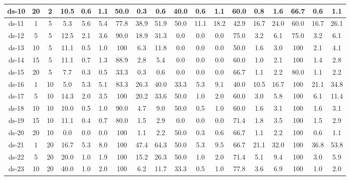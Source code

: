 \begin{table*}[h]
\begin{tabular}{|c|c|c|c|c|c|c|c|c|c|c|c|c|c|c|c|c|c|}
		\midrule
		ds-10 & 20    & 2     & 10.5  & 0.6   & 1.1   & 50.0  & 0.3   & 0.6   & 40.0  & 0.6   & 1.1   & 60.0  & 0.8   & 1.6   & 66.7  & 0.6   & 1.1 \\
		\midrule
		ds-11 & 1     & 5     & 5.3   & 5.6   & 5.4   & 77.8  & 38.9  & 51.9  & 50.0  & 11.1  & 18.2  & 42.9  & 16.7  & 24.0  & 60.0  & 16.7  & 26.1 \\
		\midrule
		ds-12 & 5     & 5     & 12.5  & 2.1   & 3.6   & 90.0  & 18.9  & 31.3  & 0.0   & 0.0   & 0.0   & 75.0  & 3.2   & 6.1   & 75.0  & 3.2   & 6.1 \\
		\midrule
		ds-13 & 10    & 5     & 11.1  & 0.5   & 1.0   & 100 & 6.3   & 11.8  & 0.0   & 0.0   & 0.0   & 50.0  & 1.6   & 3.0   & 100 & 2.1   & 4.1 \\
		\midrule
		ds-14 & 15    & 5     & 11.1  & 0.7   & 1.3   & 88.9  & 2.8   & 5.4   & 0.0   & 0.0   & 0.0   & 60.0  & 1.0   & 2.1   & 100 & 1.4   & 2.8 \\
		\midrule
		ds-15 & 20    & 5     & 7.7   & 0.3   & 0.5   & 33.3  & 0.3   & 0.6   & 0.0   & 0.0   & 0.0   & 66.7  & 1.1   & 2.2   & 80.0  & 1.1   & 2.2 \\
		\midrule
		ds-16 & 1     & 10    & 5.0   & 5.3   & 5.1   & 83.3  & 26.3  & 40.0  & 33.3  & 5.3   & 9.1   & 40.0  & 10.5  & 16.7  & 100 & 21.1  & 34.8 \\
		\midrule
		ds-17 & 5     & 10    & 14.3  & 2.0   & 3.5   & 100 & 20.2  & 33.6  & 50.0  & 1.0   & 2.0   & 60.0  & 3.0   & 5.8   & 100 & 6.1   & 11.4 \\
		\midrule
		ds-18 & 10    & 10    & 10.0  & 0.5   & 1.0   & 90.0  & 4.7   & 9.0   & 50.0  & 0.5   & 1.0   & 60.0  & 1.6   & 3.1   & 100 & 1.6   & 3.1 \\
		\midrule
		ds-19 & 15    & 10    & 11.1  & 0.4   & 0.7   & 80.0  & 1.5   & 2.9   & 0.0   & 0.0   & 0.0   & 71.4  & 1.8   & 3.5   & 100 & 1.5   & 2.9 \\
		\midrule
		ds-20 & 20    & 10    & 0.0   & 0.0   & 0.0   & 100 & 1.1   & 2.2   & 50.0  & 0.3   & 0.6   & 66.7  & 1.1   & 2.2   & 100 & 0.6   & 1.1 \\
		\midrule
		ds-21 & 1     & 20    & 16.7  & 5.3   & 8.0   & 100 & 47.4  & 64.3  & 50.0  & 5.3   & 9.5   & 66.7  & 21.1  & 32.0  & 100 & 36.8  & 53.8 \\
		\midrule
		ds-22 & 5     & 20    & 20.0  & 1.0   & 1.9   & 100 & 15.2  & 26.3  & 50.0  & 1.0   & 2.0   & 71.4  & 5.1   & 9.4   & 100 & 3.0   & 5.9 \\
		\midrule
		ds-23 & 10    & 20    & 40.0  & 1.0   & 2.0   & 100 & 6.2   & 11.7  & 33.3  & 0.5   & 1.0   & 77.8  & 3.6   & 6.9   & 100 & 1.0   & 2.0 \\

\end{tabular}
\end{table*}

